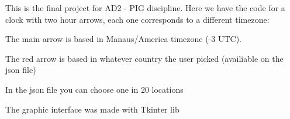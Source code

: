 This is the final project for A\+D2 -\/ P\+IG discipline. Here we have the code for a clock with two hour arrows, each one corresponds to a different timezone\+:


\begin{DoxyItemize}
\item The main arrow is based in Manaus/\+America timezone (-\/3 U\+TC).
\item The red arrow is based in whatever country the user picked (availiable on the json file)
\item In the json file you can choose one in 20 locations
\item The graphic interface was made with Tkinter lib 
\end{DoxyItemize}